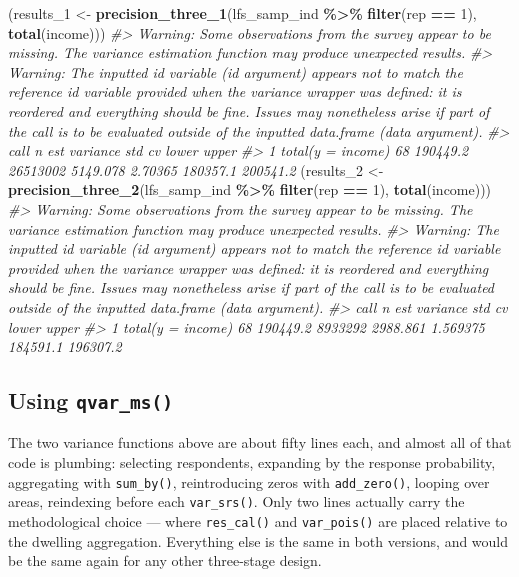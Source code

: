 \documentclass[
]{article}
\newenvironment{Shaded}{\begin{snugshade}}{\end{snugshade}}
\newcommand{\CommentTok}[1]{\textcolor[rgb]{0.56,0.35,0.01}{\textit{#1}}}
\newcommand{\DecValTok}[1]{\textcolor[rgb]{0.00,0.00,0.81}{#1}}
\newcommand{\FunctionTok}[1]{\textcolor[rgb]{0.13,0.29,0.53}{\textbf{#1}}}
\newcommand{\NormalTok}[1]{#1}
\newcommand{\OtherTok}[1]{\textcolor[rgb]{0.56,0.35,0.01}{#1}}
\newcommand{\SpecialCharTok}[1]{\textcolor[rgb]{0.81,0.36,0.00}{\textbf{#1}}}
\begin{document}
\begin{Shaded}
\begin{Highlighting}[]
\NormalTok{(results\_1 }\OtherTok{\textless{}{-}} \FunctionTok{precision\_three\_1}\NormalTok{(lfs\_samp\_ind }\SpecialCharTok{\%\textgreater{}\%} \FunctionTok{filter}\NormalTok{(rep }\SpecialCharTok{==} \DecValTok{1}\NormalTok{), }\FunctionTok{total}\NormalTok{(income)))}
\CommentTok{\#\textgreater{} Warning: Some observations from the survey appear to be missing. The variance estimation function may produce unexpected results.}
\CommentTok{\#\textgreater{} Warning: The inputted id variable (id argument) appears not to match the reference id variable provided when the variance wrapper was defined: it is reordered and everything should be fine. Issues may nonetheless arise if part of the call is to be evaluated outside of the inputted data.frame (data argument).}
\CommentTok{\#\textgreater{}                call  n      est variance      std      cv    lower    upper}
\CommentTok{\#\textgreater{} 1 total(y = income) 68 190449.2 26513002 5149.078 2.70365 180357.1 200541.2}
\NormalTok{(results\_2 }\OtherTok{\textless{}{-}} \FunctionTok{precision\_three\_2}\NormalTok{(lfs\_samp\_ind }\SpecialCharTok{\%\textgreater{}\%} \FunctionTok{filter}\NormalTok{(rep }\SpecialCharTok{==} \DecValTok{1}\NormalTok{), }\FunctionTok{total}\NormalTok{(income)))}
\CommentTok{\#\textgreater{} Warning: Some observations from the survey appear to be missing. The variance estimation function may produce unexpected results.}
\CommentTok{\#\textgreater{} Warning: The inputted id variable (id argument) appears not to match the reference id variable provided when the variance wrapper was defined: it is reordered and everything should be fine. Issues may nonetheless arise if part of the call is to be evaluated outside of the inputted data.frame (data argument).}
\CommentTok{\#\textgreater{}                call  n      est variance      std       cv    lower    upper}
\CommentTok{\#\textgreater{} 1 total(y = income) 68 190449.2  8933292 2988.861 1.569375 184591.1 196307.2}
\end{Highlighting}
\end{Shaded}

\subsection{\texorpdfstring{Using
\texttt{qvar\_ms()}}{Using qvar\_ms()}}\label{using-qvar_ms-1}

The two variance functions above are about fifty lines each, and almost
all of that code is plumbing: selecting respondents, expanding by the
response probability, aggregating with \texttt{sum\_by()}, reintroducing
zeros with \texttt{add\_zero()}, looping over areas, reindexing before
each \texttt{var\_srs()}. Only two lines actually carry the
methodological choice --- where \texttt{res\_cal()} and
\texttt{var\_pois()} are placed relative to the dwelling aggregation.
Everything else is the same in both versions, and would be the same
again for any other three-stage design.
\end{document}
